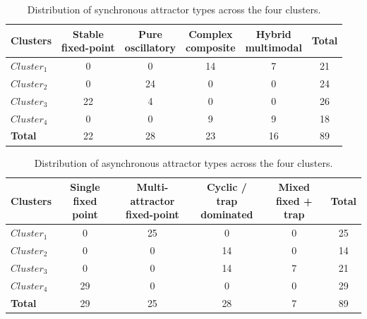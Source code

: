 \begin{table}[h!]
\centering
\caption{Distribution of synchronous attractor types across the four clusters.}
\label{tab:sync_attractor_cluster_mapping}
\begin{tabular}{lccccc}
\toprule
\textbf{Clusters} &
\makecell{\textbf{Stable}\\\textbf{fixed-point}} &
\makecell{\textbf{Pure}\\\textbf{oscillatory}} &
\makecell{\textbf{Complex}\\\textbf{composite}} &
\makecell{\textbf{Hybrid}\\\textbf{multimodal}} &
\textbf{Total} \\
\midrule
\(Cluster_1\) & 0 & 0 & 14 & 7 & 21 \\
\(Cluster_2\) & 0 & 24 & 0 & 0 & 24 \\
\(Cluster_3\) & 22 & 4 & 0 & 0 & 26 \\
\(Cluster_4\) & 0 & 0 & 9 & 9 & 18 \\
\midrule
\textbf{Total} & 22 & 28 & 23 & 16 & 89 \\
\bottomrule
\end{tabular}
\end{table}

\begin{table}[h!]
\centering
\caption{Distribution of asynchronous attractor types across the four clusters.}
\label{tab:async_attractor_cluster_mapping}
\begin{tabular}{lccccc}
\toprule
\textbf{Clusters} &
\makecell{\textbf{Single}\\\textbf{fixed point}} &
\makecell{\textbf{Multi-attractor}\\\textbf{fixed-point}} &
\makecell{\textbf{Cyclic / trap}\\\textbf{dominated}} &
\makecell{\textbf{Mixed}\\\textbf{fixed + trap}} &
\textbf{Total} \\
\midrule
\(Cluster_1\) & 0 & 25 & 0 & 0 & 25 \\
\(Cluster_2\) & 0 & 0 & 14 & 0 & 14 \\
\(Cluster_3\) & 0 & 0 & 14 & 7 & 21 \\
\(Cluster_4\) & 29 & 0 & 0 & 0 & 29 \\
\midrule
\textbf{Total} & 29 & 25 & 28 & 7 & 89 \\
\bottomrule
\end{tabular}
\end{table}
